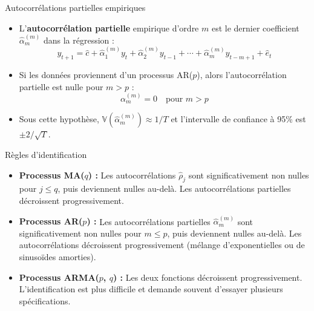 \documentclass[11pt,aspectratio=169]{beamer}
\newcommand{\Var}{\mathbb{V}}
\begin{document}
\begin{frame}{Autocorrélations partielles empiriques}

\begin{itemize}

\item L'\textbf{autocorrélation partielle} empirique d'ordre $m$ est le dernier coefficient $\hat{\alpha}_m^{(m)}$ dans la régression :
  \[
  y_{t+1} = \hat{c} + \hat{\alpha}_1^{(m)} y_t + \hat{\alpha}_2^{(m)} y_{t-1} + \cdots + \hat{\alpha}_m^{(m)} y_{t-m+1} + \hat{e}_t
  \]\newline

\item Si les données proviennent d'un processus AR($p$), alors l'autocorrélation partielle est nulle pour $m > p$ :
  \[
  \alpha_m^{(m)} = 0 \quad \text{pour } m > p
  \]\newline

\item Sous cette hypothèse, $\Var(\hat{\alpha}_m^{(m)}) \approx 1/T$ et l'intervalle de confiance à 95\% est $\pm 2/\sqrt{T}$.

\end{itemize}

\end{frame}

\begin{frame}{Règles d'identification}

\begin{itemize}

\item \textbf{Processus MA($q$) :} Les autocorrélations $\hat{\rho}_j$ sont significativement non nulles pour $j \leq q$, puis deviennent nulles au-delà. Les autocorrélations partielles décroissent progressivement.\newline

\item \textbf{Processus AR($p$) :} Les autocorrélations partielles $\hat{\alpha}_m^{(m)}$ sont significativement non nulles pour $m \leq p$, puis deviennent nulles au-delà. Les autocorrélations décroissent progressivement (mélange d'exponentielles ou de sinusoïdes amorties).\newline

\item \textbf{Processus ARMA($p$, $q$) :} Les deux fonctions décroissent progressivement. L'identification est plus difficile et demande souvent d'essayer plusieurs spécifications.

\end{itemize}

\end{frame}
\end{document}
